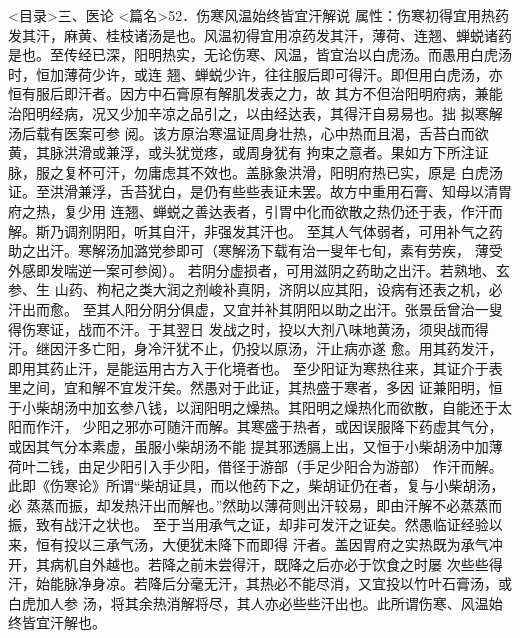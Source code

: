 \documentclass[a4paper,12pt,UTF8,twoside]{ctexbook}
\begin{document}
<目录>三、医论
<篇名>52．伤寒风温始终皆宜汗解说
属性：伤寒初得宜用热药发其汗，麻黄、桂枝诸汤是也。风温初得宜用凉药发其汗，薄荷、连翘、蝉蜕诸药 
是也。至传经已深，阳明热实，无论伤寒、风温，皆宜治以白虎汤。而愚用白虎汤时，恒加薄荷少许，或连 
翘、蝉蜕少许，往往服后即可得汗。即但用白虎汤，亦恒有服后即汗者。因方中石膏原有解肌发表之力，故 
其方不但治阳明府病，兼能治阳明经病，况又少加辛凉之品引之，以由经达表，其得汗自易易也。拙 
拟寒解汤后载有医案可参 
阅。该方原治寒温证周身壮热，心中热而且渴，舌苔白而欲黄，其脉洪滑或兼浮，或头犹觉疼，或周身犹有 
拘束之意者。果如方下所注证脉，服之复杯可汗，勿庸虑其不效也。盖脉象洪滑，阳明府热已实，原是 
白虎汤证。至洪滑兼浮，舌苔犹白，是仍有些些表证未罢。故方中重用石膏、知母以清胃府之热，复少用 
连翘、蝉蜕之善达表者，引胃中化而欲散之热仍还于表，作汗而解。斯乃调剂阴阳，听其自汗，非强发其汗也。 
至其人气体弱者，可用补气之药助之出汗。寒解汤加潞党参即可（寒解汤下载有治一叟年七旬，素有劳疾， 
薄受外感即发喘逆一案可参阅）。 
若阴分虚损者，可用滋阴之药助之出汗。若熟地、玄参、生 
山药、枸杞之类大润之剂峻补真阴，济阴以应其阳，设病有还表之机，必汗出而愈。 
至其人阳分阴分俱虚，又宜并补其阴阳以助之出汗。张景岳曾治一叟得伤寒证，战而不汗。于其翌日 
发战之时，投以大剂八味地黄汤，须臾战而得汗。继因汗多亡阳，身冷汗犹不止，仍投以原汤，汗止病亦遂 
愈。用其药发汗，即用其药止汗，是能运用古方入于化境者也。 
至少阳证为寒热往来，其证介于表里之间，宜和解不宜发汗矣。然愚对于此证，其热盛于寒者，多因 
证兼阳明，恒于小柴胡汤中加玄参八钱，以润阳明之燥热。其阳明之燥热化而欲散，自能还于太阳而作汗， 
少阳之邪亦可随汗而解。其寒盛于热者，或因误服降下药虚其气分，或因其气分本素虚，虽服小柴胡汤不能 
提其邪透膈上出，又恒于小柴胡汤中加薄荷叶二钱，由足少阳引入手少阳，借径于游部（手足少阳合为游部） 
作汗而解。此即《伤寒论》所谓“柴胡证具，而以他药下之，柴胡证仍在者，复与小柴胡汤，必 
蒸蒸而振，却发热汗出而解也。”然助以薄荷则出汗较易，即由汗解不必蒸蒸而振，致有战汗之状也。 
至于当用承气之证，却非可发汗之证矣。然愚临证经验以来，恒有投以三承气汤，大便犹未降下而即得 
汗者。盖因胃府之实热既为承气冲开，其病机自外越也。若降之前未尝得汗，既降之后亦必于饮食之时屡 
次些些得汗，始能脉净身凉。若降后分毫无汗，其热必不能尽消，又宜投以竹叶石膏汤，或白虎加人参 
汤，将其余热消解将尽，其人亦必些些汗出也。此所谓伤寒、风温始终皆宜汗解也。 
\end{document}
